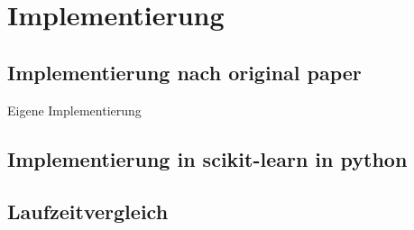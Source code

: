 \chapter{Implementierung}

\label{implementation}

\section{Implementierung nach original paper}
Eigene Implementierung

\section{Implementierung in scikit-learn in python}

\section{Laufzeitvergleich}